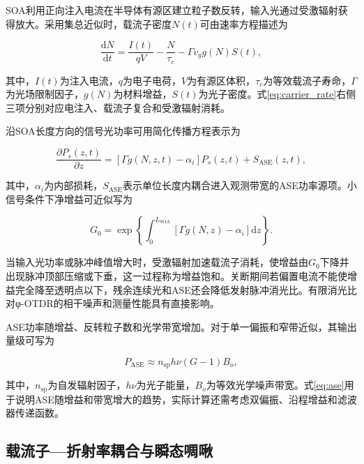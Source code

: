 SOA利用正向注入电流在半导体有源区建立粒子数反转，输入光通过受激辐射获得放大。采用集总近似时，载流子密度$N(t)$可由速率方程描述为

\begin{equation}
\frac{\mathrm dN}{\mathrm dt}
=
\frac{I(t)}{qV}
-\frac{N}{\tau_c}
-\Gamma v_g g(N)S(t),
\label{eq:carrier_rate}
\end{equation}

其中，$I(t)$为注入电流，$q$为电子电荷，$V$为有源区体积，$\tau_c$为等效载流子寿命，$\Gamma$为光场限制因子，$g(N)$为材料增益，$S(t)$为光子密度。式\eqref{eq:carrier_rate}右侧三项分别对应电注入、载流子复合和受激辐射消耗\cite{talli2003gain,yang2021carrier,sobhanan2022soa}。

沿SOA长度方向的信号光功率可用简化传播方程表示为

\begin{equation}
\frac{\partial P_s(z,t)}{\partial z}
=
\left[\Gamma g\!\left(N,z,t\right)-\alpha_i\right]P_s(z,t)
+S_{\mathrm{ASE}}(z,t),
\label{eq:soa_power}
\end{equation}

其中，$\alpha_i$为内部损耗，$S_{\mathrm{ASE}}$表示单位长度内耦合进入观测带宽的ASE功率源项。小信号条件下净增益可近似写为

\begin{equation}
G_0
=
\exp\left\{
\int_0^{L_{\mathrm{SOA}}}
\left[\Gamma g(N,z)-\alpha_i\right]\mathrm dz
\right\}.
\label{eq:soa_gain}
\end{equation}

当输入光功率或脉冲峰值增大时，受激辐射加速载流子消耗，使增益由$G_0$下降并出现脉冲顶部压缩或下垂，这一过程称为增益饱和\cite{mecozzi1997saturation,sobhanan2022soa,connelly2023dynamic}。关断期间若偏置电流不能使增益完全降至透明点以下，残余连续光和ASE还会降低发射脉冲消光比。有限消光比对φ-OTDR的相干噪声和测量性能具有直接影响\cite{ren2016extinction}。

ASE功率随增益、反转粒子数和光学带宽增加。对于单一偏振和窄带近似，其输出量级可写为

\begin{equation}
P_{\mathrm{ASE}}
\approx
n_{\mathrm{sp}}h\nu(G-1)B_o,
\label{eq:ase}
\end{equation}

其中，$n_{\mathrm{sp}}$为自发辐射因子，$h\nu$为光子能量，$B_o$为等效光学噪声带宽。式\eqref{eq:ase}用于说明ASE随增益和带宽增大的趋势，实际计算还需考虑双偏振、沿程增益和滤波器传递函数\cite{baveja2010selfphase}。

\subsection{载流子—折射率耦合与瞬态啁啾}

